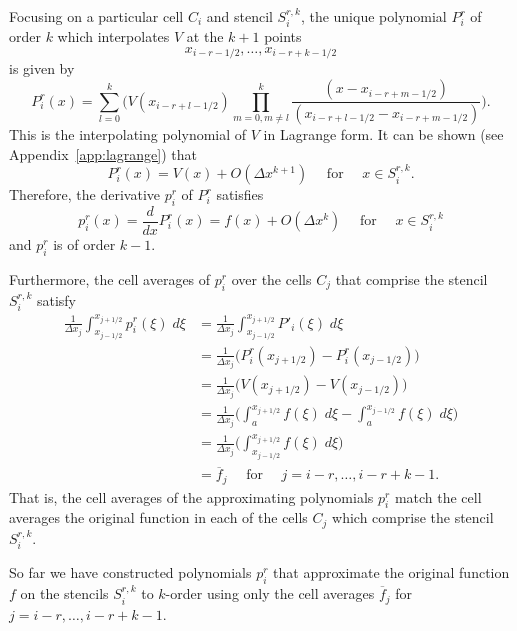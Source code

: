 \documentclass{article}
\newcommand{\dd}[2]{\frac{d #1}{d #2}}
\newcommand{\for}[0]{\quad \text{ for } \quad}
\newcommand{\xlj}[0]{x_{j-1/2}}
\newcommand{\xrj}[0]{x_{j+1/2}}
\numberwithin{equation}{section}
\begin{document}
Focusing on a particular cell $C_i$ and stencil $S_i^{r,k}$, the
unique polynomial $P^r_i$ of order $k$ which interpolates $V$ at the
$k+1$ points
\begin{equation*}
  x_{i-r-1/2}, \ldots, x_{i-r+k-1/2}
\end{equation*}
is given by
\begin{equation}
  \label{eq:P}
  P^r_i(x) = \sum_{l=0}^{k} \Biggl(
    V(x_{i-r+l-1/2}) \prod_{m=0, m \neq l}^{k}
      \frac{(x - x_{i-r+m-1/2})}{(x_{i-r+l-1/2} - x_{i-r+m-1/2})}
    \Biggr).
\end{equation}
This is the interpolating polynomial of $V$ in Lagrange form.
It can be shown (see Appendix~\ref{app:lagrange}) that
\begin{equation*}
  P^r_i(x) = V(x) + O(\Delta x^{k+1}) \for x \in S_i^{r,k}.
\end{equation*}
Therefore, the derivative $p^r_i$ of $P^r_i$ satisfies
\begin{equation*}
  p^r_i(x) = \dd{}{x} P^r_i(x) = f(x) + O(\Delta x^k) \for x \in S_i^{r,k}
\end{equation*}
and $p^r_i$ is of order $k-1$.

Furthermore, the cell averages of $p^r_i$ over the cells $C_j$ that
comprise the stencil $S_i^{r,k}$ satisfy
\begin{align*}
  \frac{1}{\Delta x_j} \int_{\xlj}^{\xrj} p^r_i(\xi) \;d\xi
    &= \frac{1}{\Delta x_j} \int_{\xlj}^{\xrj} P'_i(\xi) \;d\xi \\
    &= \frac{1}{\Delta x_j} \biggl( P^r_i(\xrj) - P^r_i(\xlj) \biggr) \\
    &= \frac{1}{\Delta x_j} \biggl( V(\xrj) - V(\xlj) \biggr) \\
    &= \frac{1}{\Delta x_j} \biggl( \int_a^{\xrj} f(\xi) \;d\xi
      - \int_a^{\xlj} f(\xi) \;d\xi \biggr) \\
    &= \frac{1}{\Delta x_j} \biggl(
      \int_{\xlj}^{\xrj} f(\xi) \;d\xi \biggr) \\
    &= \overline{f}_j \for j=i-r,\ldots,i-r+k-1.
\end{align*}
That is, the cell averages of the approximating polynomials $p^r_i$
match the cell averages the original function in each of the cells
$C_j$ which comprise the stencil $S_i^{r,k}$.

So far we have constructed polynomials $p^r_i$ that approximate the
original function $f$ on the stencils $S_{i}^{r,k}$ to $k$-order using
only the cell averages $\overline{f}_j$ for $j=i-r,\ldots,i-r+k-1$.
\end{document}
